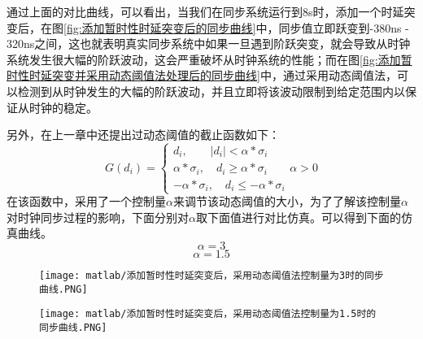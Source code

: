 通过上面的对比曲线，可以看出，当我们在同步系统运行到8s时，添加一个时延突变后，在图\ref{fig:添加暂时性时延突变后的同步曲线}中，同步值立即跃变到-380ns - 320ns之间，这也就表明真实同步系统中如果一旦遇到阶跃突变，就会导致从时钟系统发生很大幅的阶跃波动，这会严重破坏从时钟系统的性能；而在图\ref{fig:添加暂时性时延突变并采用动态阈值法处理后的同步曲线}中，通过采用动态阈值法，可以检测到从时钟发生的大幅的阶跃波动，并且立即将该波动限制到给定范围内以保证从时钟的稳定。

另外，在上一章中还提出过动态阈值的截止函数如下：
\begin{equation}
G(d_{i}) = \left\{
  \begin{array}{lll} %
    d_{i}, \qquad \left | d_{i} \right | < \alpha * \sigma_{i} \\
    \alpha * \sigma_{i}, \quad d_{i} \geq \alpha * \sigma_{i} \\
    -\alpha * \sigma_{i}, \quad d_{i} \leq -\alpha * \sigma_{i}
  \end{array}
  \alpha > 0 \right. 
\end{equation}
在该函数中，采用了一个控制量$\alpha$来调节该动态阈值的大小，为了了解该控制量$\alpha$对时钟同步过程的影响，下面分别对$\alpha$取下面值进行对比仿真。可以得到下面的仿真曲线。
\begin{equation}
  \alpha = 3
\end{equation}
\begin{equation}
  \alpha = 1.5
\end{equation}
\begin{figure}[hbp]
  \centering
  \begin{minipage}[b]{1\textwidth}
    \captionstyle{\centering}
    \centering
    \texttt{[image: matlab/添加暂时性时延突变后，采用动态阈值法控制量为3时的同步曲线.PNG]}
  \end{minipage}     
\end{figure}

\begin{figure}[htbp]
  \centering
  \begin{minipage}[b]{1\textwidth}
    \captionstyle{\centering}
    \centering
    \texttt{[image: matlab/添加暂时性时延突变后，采用动态阈值法控制量为1.5时的同步曲线.PNG]}
  \end{minipage}     
\end{figure}

